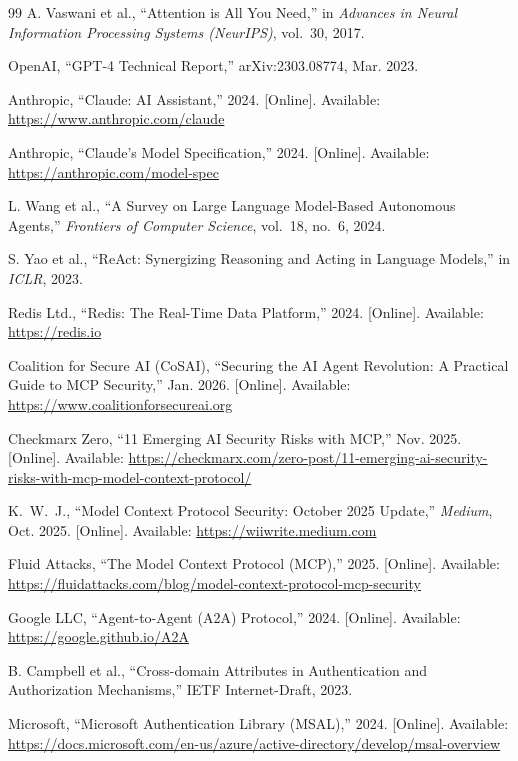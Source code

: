 \documentclass[journal]{IEEEtran}
\begin{document}
\begin{thebibliography}{99}
A. Vaswani et al., ``Attention is All You Need,'' in \textit{Advances in Neural Information Processing Systems (NeurIPS)}, vol.\ 30, 2017.

OpenAI, ``GPT-4 Technical Report,'' arXiv:2303.08774, Mar. 2023.

Anthropic, ``Claude: AI Assistant,'' 2024. [Online]. Available: \url{https://www.anthropic.com/claude}

Anthropic, ``Claude's Model Specification,'' 2024. [Online]. Available: \url{https://anthropic.com/model-spec}

L. Wang et al., ``A Survey on Large Language Model-Based Autonomous Agents,'' \textit{Frontiers of Computer Science}, vol.\ 18, no.\ 6, 2024.

S. Yao et al., ``ReAct: Synergizing Reasoning and Acting in Language Models,'' in \textit{ICLR}, 2023.

Redis Ltd., ``Redis: The Real-Time Data Platform,'' 2024. [Online]. Available: \url{https://redis.io}

Coalition for Secure AI (CoSAI), ``Securing the AI Agent Revolution: A Practical Guide to MCP Security,'' Jan. 2026. [Online]. Available: \url{https://www.coalitionforsecureai.org}

Checkmarx Zero, ``11 Emerging AI Security Risks with MCP,'' Nov. 2025. [Online]. Available: \url{https://checkmarx.com/zero-post/11-emerging-ai-security-risks-with-mcp-model-context-protocol/}

K.\ W.\ J., ``Model Context Protocol Security: October 2025 Update,'' \textit{Medium}, Oct. 2025. [Online]. Available: \url{https://wiiwrite.medium.com}

Fluid Attacks, ``The Model Context Protocol (MCP),'' 2025. [Online]. Available: \url{https://fluidattacks.com/blog/model-context-protocol-mcp-security}

Google LLC, ``Agent-to-Agent (A2A) Protocol,'' 2024. [Online]. Available: \url{https://google.github.io/A2A}

B. Campbell et al., ``Cross-domain Attributes in Authentication and Authorization Mechanisms,'' IETF Internet-Draft, 2023.

Microsoft, ``Microsoft Authentication Library (MSAL),'' 2024. [Online]. Available: \url{https://docs.microsoft.com/en-us/azure/active-directory/develop/msal-overview}


\end{thebibliography}
\end{document}
